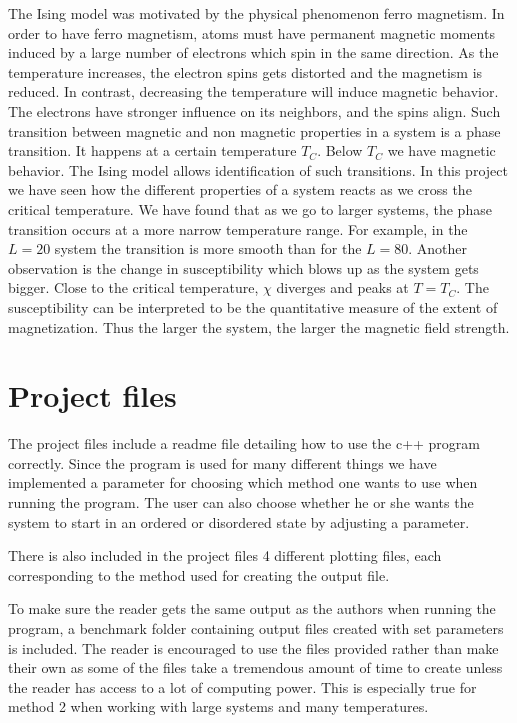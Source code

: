\documentclass{aa}   %
\begin{document}
The Ising model was motivated by the physical phenomenon ferro magnetism. In order to have ferro magnetism, atoms must have permanent magnetic moments induced by a large number of electrons which spin in the same direction. As the temperature  increases, the electron spins gets distorted and the magnetism is reduced. In contrast, decreasing the temperature will induce magnetic behavior. The electrons have stronger influence on its neighbors, and the spins align. Such transition between magnetic and non magnetic properties in a system is a phase transition. It happens at a certain temperature $T_C$. Below $T_C$ we have magnetic behavior. The Ising model allows identification of such transitions. In this project we have seen how the different properties of a system reacts as we cross the critical temperature. We have found that as we go to larger systems, the phase transition occurs at a more narrow temperature range. For example, in the $L=20$ system the transition is more smooth than for the $L=80$. Another observation is the change in susceptibility which blows up as the system gets bigger. Close to the critical temperature, $\chi$ diverges and peaks at $T = T_C$. The susceptibility can be interpreted to be the quantitative measure of the extent of magnetization. 
Thus the larger the system, the larger the magnetic field strength.

\section{Project files}\label{sec:files}
The project files include a readme file detailing how to use the c++ program correctly. 
Since the program is used for many different things we have implemented a parameter for choosing which method one wants to use when running the program. The user can also choose whether he or she wants the system to start in an ordered or disordered state by adjusting a parameter. 

There is also included in the project files 4 different plotting files, each corresponding to the method used for creating the output file. 

To make sure the reader gets the same output as the authors when running the program, a benchmark folder containing output files created with set parameters is included. The reader is encouraged to use the files provided rather than make their own as some of the files take a tremendous amount of time to create unless the reader has access to a lot of computing power. This is especially true for method 2 when working with large systems and many temperatures.
\end{document}
